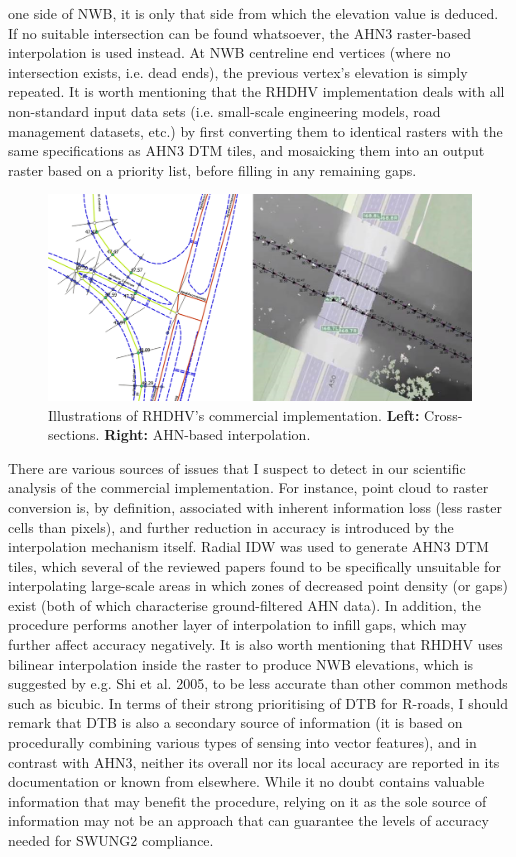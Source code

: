 one side of NWB, it is only that side from which the elevation value is deduced. If no suitable intersection can be found whatsoever, the AHN3 raster-based interpolation is used instead. At NWB centreline end vertices (where no intersection exists, i.e. dead ends), the previous vertex’s elevation is simply repeated. It is worth mentioning that the RHDHV implementation deals with all non-standard input data sets (i.e. small-scale engineering models, road management datasets, etc.) by first converting them to identical rasters with the same specifications as AHN3 DTM tiles, and mosaicking them into an output raster based on a priority list, before filling in any remaining gaps.

\begin{figure}[h]
    \centering
    \includegraphics[width=\linewidth]{p2/figs/rhdhv_combined.png} 
    \caption{Illustrations of RHDHV's commercial implementation. \textbf{Left:} Cross-sections. \textbf{Right:} AHN-based interpolation.}
    \label{fig:dtbahn}
\end{figure}

There are various sources of issues  that I suspect to detect in our scientific analysis of the commercial implementation. For instance, point cloud to raster conversion is, by definition, associated with inherent information loss (less raster cells than pixels), and further reduction in accuracy is introduced by the interpolation mechanism itself. Radial IDW was used to generate AHN3 DTM tiles, which several of the reviewed papers found to be specifically unsuitable for interpolating large-scale areas in which zones of decreased point density (or gaps) exist (both of which characterise ground-filtered AHN data). In addition, the procedure performs another layer of interpolation to infill gaps, which may further affect accuracy negatively. It is also worth mentioning that RHDHV uses bilinear interpolation inside the raster to produce NWB elevations, which is suggested by e.g. Shi et al. 2005, to be less accurate than other common methods such as bicubic. In terms of their strong prioritising of DTB for R-roads, I should remark that DTB is also a secondary source of information (it is based on procedurally combining various types of sensing into vector features), and in contrast with AHN3, neither its overall nor its local accuracy are reported in its documentation or known from elsewhere. While it no doubt contains valuable information that may benefit the procedure, relying on it as the sole source of information may not be an approach that can guarantee the levels of accuracy needed for SWUNG2 compliance.

